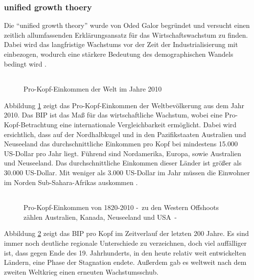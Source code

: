 \subsubsection*{unified growth thoery}\label{Unified}
Die "`unified growth theory"' wurde von Oded Galor begründet und versucht einen zeitlich allumfassenden Erklärungsansatz für das Wirtschaftswachstum zu finden. Dabei wird das langfristige Wachstums vor der Zeit der Industrialisierung mit einbezogen, wodurch eine stärkere Bedeutung des demographischen Wandels bedingt wird \cite{Galor.2011}.
%
	\begin{figure}[h!]
 		\centering 
		 \begin{tabular}{@{}r@{}} 
 		\end{tabular}  
		\caption{Pro-Kopf-Einkommen der Welt im Jahre 2010}\label{KarteEinkommen}
	\end{figure}
%
Abbildung \ref{KarteEinkommen} zeigt das Pro-Kopf-Einkommen der Weltbevölkerung aus dem Jahr 2010. Das BIP ist das Maß für das wirtschaftliche Wachstum, wobei eine Pro-Kopf-Betrachtung eine internationale Vergleichbarkeit ermöglicht. Dabei wird ersichtlich, dass auf der Nordhalbkugel und in den Pazifikstaaten Australien und Neuseeland das durchschnittliche Einkommen pro Kopf bei mindestens 15.000 US-Dollar pro Jahr liegt. Führend sind Nordamerika, Europa, sowie Australien und Neuseeland. Das durchschnittliche Einkommen dieser Länder ist größer als 30.000 US-Dollar. Mit weniger als 3.000 US-Dollar im Jahr müssen die Einwohner im Norden Sub-Sahara-Afrikas auskommen \cite[Kapitel 1]{Galor.2014}.\\
%		
		\begin{figure}[h!]
			\centering 
				\begin{tabular}{@{}r@{}}  
				\end{tabular}  
			\caption{Pro-Kopf-Einkommen von 1820-2010 -~zu den Western Offshoots zählen Australien, Kanada, Neuseeland und USA~-}\label{BIP200Jahre}
		\end{figure}
%		
Abbildung \ref{BIP200Jahre} zeigt das BIP pro Kopf im Zeitverlauf der letzten 200 Jahre. Es sind immer noch deutliche regionale Unterschiede zu verzeichnen, doch viel auffälliger ist, dass gegen Ende des 19. Jahrhunderts, in den heute relativ weit entwickelten Ländern, eine Phase der Stagnation endete. Außerdem gab es weltweit nach dem zweiten Weltkrieg einen erneuten Wachstumsschub.
